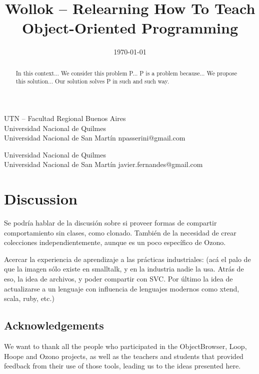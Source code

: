\documentclass[preprint,10pt]{sigplanconf}
\begin{document}
\title{Wollok -- Relearning How To Teach Object-Oriented Programming}
  {UTN -- Facultad Regional Buenos Aires \\ Universidad Nacional de Quilmes \\ Universidad Nacional de San Martín}
  {npasserini@gmail.com}
  
  {Universidad Nacional de Quilmes \\ Universidad Nacional de San Martín}
  {javier.fernandes@gmail.com}

\date{\today}
\maketitle

\begin{abstract}
In this context...
We consider this problem P...
P is a problem because...
We propose this solution...
Our solution solves P in such and such way.
\end{abstract}






\section{Discussion}
\label{sec:discussion}


Se podría hablar de la discusión sobre si proveer formas de compartir comportamiento sin clases, como clonado.
También de la necesidad de crear colecciones independientemente, aunque es un poco específico de Ozono.

\medskip
Acercar la experiencia de aprendizaje a las prácticas industriales: 
(acá el palo de que la imagen sólo existe en smalltalk, y en la industria nadie la usa. 
Atrás de eso, la idea de archivos, y poder compartir con SVC. Por último la idea de actualizarse a un lenguaje con influencia de lenguajes modernos como xtend, scala, ruby, etc.)






\subsection*{Acknowledgements}
We want to thank all the people who participated in the ObjectBrowser, Loop, Hoope and Ozono projects, 
as well as the teachers and students that provided feedback from their use of those tools, leading us to the ideas presented here.
\end{document}
